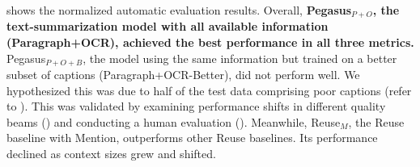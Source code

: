  shows the normalized automatic evaluation results. 
Overall, \textbf{Pegasus$_{P+O}$, the text-summarization model with all available information (Paragraph+OCR), 
achieved the best performance in all three metrics.}
Pegasus$_{P+O+B}$, the model using the same information but trained on a better subset of captions (Paragraph+OCR-Better), did not perform well. 
We hypothesized this was due to half of the test data comprising poor captions (refer to ). 
This was validated by examining performance shifts in different quality beams () and conducting a human evaluation ().
Meanwhile, Reuse$_{M}$, the Reuse baseline with Mention, outperforms other Reuse baselines.
Its performance declined as context sizes grew and shifted.

% 

















